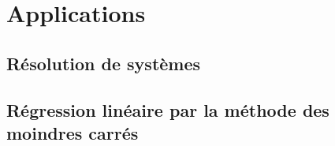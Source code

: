 \section{Applications}
\subsection{Résolution de systèmes}
\setcounter{thequestion}{0}

\subsection{Régression linéaire par la méthode des moindres carrés}
\setcounter{thequestion}{0}

